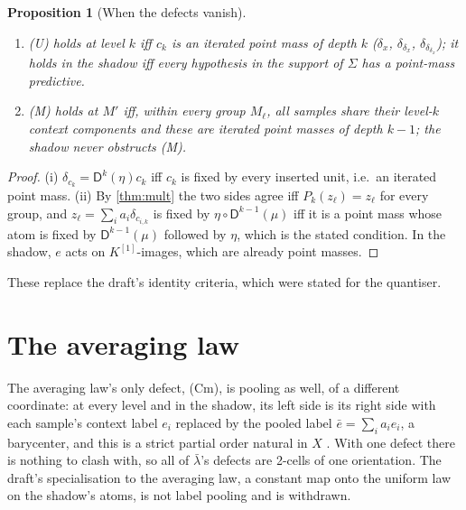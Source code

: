 \documentclass[11pt]{article}
\newtheorem{proposition}[theorem]{Proposition}
\theoremstyle{definition}
\newcommand{\D}{\mathsf D}
\newcommand{\lb}{\bar\lambda}
\begin{document}
\begin{proposition}[When the defects vanish]\label{prop:identity}
\begin{enumerate}[label=(\roman*),nosep]
\item (U) holds at level $k$ iff $c_k$ is an iterated point mass of depth $k$ ($\delta_x$, $\delta_{\delta_x}$, $\delta_{\delta_{\delta_x}}$); it holds in
  the shadow iff every hypothesis in the support of $\Sigma$ has a point-mass predictive.
\item (M) holds at $M'$ iff, within every group $M_\ell$, all samples share their level-$k$ context components and these are iterated
  point masses of depth $k-1$; the shadow never obstructs (M).
\end{enumerate}
\end{proposition}
\begin{proof}
(i) $\delta_{c_k}=\D^k(\eta)c_k$ iff $c_k$ is fixed by every inserted unit, i.e.\ an iterated point mass. (ii) By \cref{thm:mult} the two
sides agree iff $P_k(z_\ell)=z_\ell$ for every group, and $z_\ell=\sum_ia_i\delta_{c_{i,k}}$ is fixed by $\eta\circ\D^{k-1}(\mu)$ iff it is a
point mass whose atom is fixed by $\D^{k-1}(\mu)$ followed by $\eta$, which is the stated condition. In the shadow, $e$ acts on
$K^{[1]}$-images, which are already point masses.
\end{proof}

These replace the draft's identity criteria, which were stated for the quantiser.

\section{The averaging law}
The averaging law's only defect, (Cm), is pooling as well, of a different coordinate: at every level and in the shadow, its left side is
its right side with each sample's context label $e_i$ replaced by the pooled label $\bar e=\sum_ia_ie_i$, a barycenter, and this is a strict
partial order natural in $X$ \cite[Thm.~13.16]{Tower}. With one defect there is nothing to clash with, so all of $\lb$'s defects are
2-cells of one orientation. The draft's specialisation to the averaging law, a constant map onto the uniform law on the shadow's
atoms, is not label pooling and is withdrawn.
\end{document}

